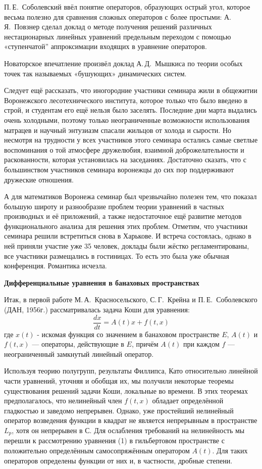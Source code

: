 П.\,Е.~Соболевский ввёл понятие операторов, образующих острый угол,  которое весьма полезно для сравнения сложных операторов с более простыми: А.\,Я.~Повзнер сделал доклад о методе получения решений различных нестационарных линейных уравнений предельным переходом с помощью «ступенчатой”  аппроксимации входящих в уравнение операторов.

Новаторское впечатление произвёл доклад А.\,Д.~Мышкиса по теории особых точек так называемых «бушующих» динамических систем.

 	Следует ещё рассказать, что иногородние участники семинара жили в общежитии Воронежского лесотехнического института, которое только что было введено в строй, и студентам его ещё нельзя было заселять. Последние дни марта выдались очень холодными, поэтому только неограниченные возможности использования матрацев и научный энтузиазм спасали жильцов от холода и сырости. Но несмотря на трудности у всех участников этого семинара остались самые светлые воспоминания о той атмосфере дружелюбия, взаимной доброжелательности и раскованности, которая установилась на заседаниях. Достаточно сказать, что с большинством участников семинара воронежцы до сих пор поддерживают дружеские отношения.

А для математиков Воронежа семинар был чрезвычайно полезен тем, что показал большую широту и разнообразие проблем теории уравнений в       частных производных и её приложений, а также недостаточное ещё развитие методов функционального анализа для решения этих проблем.
Отметим, что участники семинара решили встретиться снова в Харькове. И встреча состоялась, однако в ней приняли участие уже 35 человек, доклады были жёстко регламентированы, все участники размещались в гостиницах. То есть это была уже обычная конференция. Романтика исчезла.

{\bf Дифференциальные уравнения в банаховых пространствах}

Итак, в первой работе М.\,А.~Красносельского, С.\,Г.~Крейна и П.\,Е.~Соболевского (ДАН, 1956г.) рассматривалась задача Коши для уравнения:
\begin{equation}
\frac{dx}{dt} = A(t)x + f(t, x)
\end{equation}
где $x(t)$ - искомая функция со значением в банаховом пространстве $E$, $A(t)$ и $f(t,x)$ --- операторы, действующие в $E$, причём $A(t)$ при каждом $f$ --- неограниченный замкнутый линейный оператор.

Используя теорию полугрупп, результаты Филлипса, Като относительно линейной части уравнений, уточняя и обобщая их, мы получили некоторые теоремы существования решений задачи Коши, локальные во времени. В этих теоремах предполагалось, что нелинейный член $f(t,x)$ обладает определённой гладкостью и заведомо непрерывен. Однако, уже простейший нелинейный оператор возведения функции в квадрат не является непрерывным в пространстве $L_p$, хотя он непрерывен в С. Для ослабления требований на нелинейность мы перешли к рассмотрению уравнения (1) в гильбертовом пространстве с положительно определённым самосопряжённым оператором $A(t)$. Для таких операторов определены функции от них и, в частности, дробные степени.

